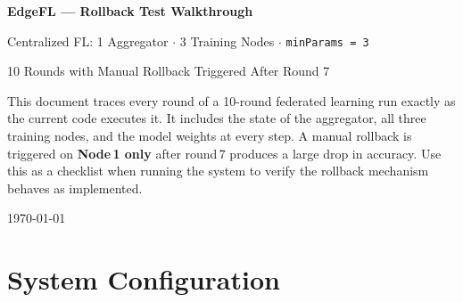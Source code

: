 \documentclass[11pt,a4paper]{article}
\begin{document}
\begin{titlepage}
  \centering
  \vspace*{3cm}
  {\LARGE\bfseries EdgeFL --- Rollback Test Walkthrough\par}
  \vspace{1em}
  {\large Centralized FL: 1 Aggregator $\cdot$ 3 Training Nodes $\cdot$ \texttt{minParams = 3}\par}
  \vspace{0.5em}
  {\large 10 Rounds with Manual Rollback Triggered After Round 7\par}
  \vspace{3cm}

  \begin{tcolorbox}[infobox={Purpose}]
    This document traces every round of a 10-round federated learning run
    exactly as the current code executes it.  It includes the state of the
    aggregator, all three training nodes, and the model weights at every step.
    A manual rollback is triggered on \textbf{Node\,1 only} after round\,7
    produces a large drop in accuracy.  Use this as a checklist when running
    the system to verify the rollback mechanism behaves as implemented.
  \end{tcolorbox}

  \vspace{2cm}
  {\large\today}
\end{titlepage}

\tableofcontents
\newpage

\section{System Configuration}
\label{sec:config}
\end{document}
